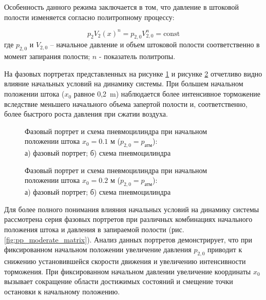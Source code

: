 Особенность данного режима заключается в том, что давление в штоковой полости изменяется согласно политропному процессу:

\begin{equation*}
	p_2V_2(x)^n = p_{2,0}V_{2,0}^n = \text{const}
\end{equation*}
где $p_{2,0}$ и $V_{2,0}$ -- начальное давление и объем штоковой полости соответственно в момент запирания полости;
$n$ - показатель политропы.

На фазовых портретах представленных на рисунке \ref{fig:pp_moderate_position_1} и рисунке \ref{fig:pp_moderate_position_2}
отчетливо видно влияние начальных условий на динамику системы. При большем начальном положении штока ($x_0$ равное 0,2~\si{\metre}) наблюдается более
интенсивное торможение вследствие меньшего начального объема запертой полости и, соответственно, более быстрого роста давления при сжатии воздуха.

\begin{figure}[htbp]
	\caption{Фазовый портрет и схема пневмоцилиндра при начальном положении штока $x_0 = \num{0.1}$ м ($p_{2,0} = p_\text{атм}$):\\
		а) фазовый портрет; б) схема пневмоцилиндра}
	\label{fig:pp_moderate_position_1}
\end{figure}

\begin{figure}[htbp]
	\caption{Фазовый портрет и схема пневмоцилиндра при начальном положении штока $x_0 = \num{0.2}$ м ($p_{2,0} = p_\text{атм}$):\\
		а) фазовый портрет; б) схема пневмоцилиндра}
	\label{fig:pp_moderate_position_2}
\end{figure}

Для более полного понимания влияния начальных условий на динамику системы рассмотрена серия фазовых
портретов при различных комбинациях начального положения штока и давления в запираемой
полости (рис. \ref{fig:pp_moderate_matrix}). Анализ данных портретов демонстрирует, что при
фиксированном начальном положении увеличение давления $p_{2,0}$ приводит к снижению установившейся скорости
движения и увеличению интенсивности торможения. При фиксированном начальном давлении
увеличение координаты $x_0$ вызывает сокращение области достижимых состояний и смещение точки остановки к начальному положению.

